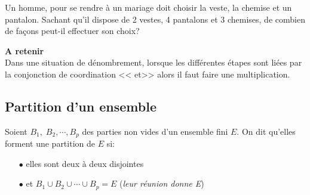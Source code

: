  \begin{exercice}
Un homme, pour se rendre à un mariage doit choisir la veste,  la chemise  et un pantalon. Sachant qu'il dispose de 2 vestes, 4 pantalons et 3 chemises, de combien de façons peut-il effectuer son choix? 
   \end{exercice}
 
\textbf{A retenir}\\
 Dans une situation de dénombrement, lorsque les différentes étapes sont liées par la conjonction de coordination  << et>>   alors il faut faire une multiplication.

\subsection*{Partition d'un ensemble}
\begin{definition}
Soient $ B_{1}, \; B_{2}, \cdots, B_{p} $ des  parties non vides d'un ensemble fini $ E. $  On dit qu'elles forment une partition de $ E $ si:
\begin{itemize}
\item[$  \bullet$] elles sont deux à deux disjointes 
\item[$  \bullet$]  et  $B_{1}\cup B_{2}\cup  \cdots\cup B_{p} =E $\; (\textit{leur réunion donne E})
\end{itemize}
\end{definition}

\bigskip
{}

